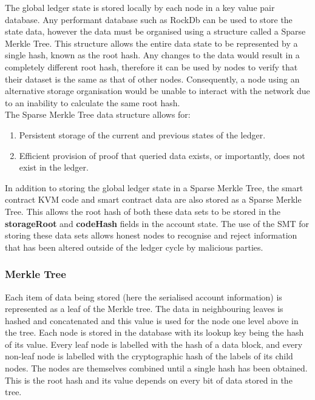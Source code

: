 
The global ledger state is stored locally by each node in a key value pair database. Any performant database such as RockDb can be used to store the state data, however the data must be organised using a structure called a Sparse Merkle Tree. This structure allows the entire data state to be represented by a single hash, known as the root hash. Any changes to the data would result in a completely different root hash, therefore it can be used by nodes to verify that their dataset is the same as that of other nodes. Consequently, a node using an alternative storage organisation would be unable to interact with the network due to an inability to calculate the same root hash.\\

The Sparse Merkle Tree data structure allows for:

\begin{enumerate}
\item Persistent storage of the current and previous states of the ledger.
\item Efficient provision of proof that queried data exists, or importantly, does not exist in the ledger.\end{enumerate}

In addition to storing the global ledger state in a Sparse Merkle Tree, the smart contract KVM code and smart contract data are also stored as a Sparse Merkle Tree. This allows the root hash of both these data sets to be stored in the \textbf{storageRoot} and \textbf{codeHash} fields in the account state.  The use of the SMT for storing these data sets allows honest nodes to recognise and reject information that has been altered outside of the ledger cycle by malicious parties. \\

\subsubsection{Merkle Tree}

Each item of data being stored (here the serialised account information) is represented as a leaf of the Merkle tree. The data in neighbouring leaves is hashed and concatenated and this value is used for the node one level above in the tree. Each node is stored in the database with its lookup key being the hash of its value. Every leaf node is labelled with the hash of a data block, and every non-leaf node is labelled with the cryptographic hash of the labels of its child nodes. The nodes are themselves combined until a single hash has been obtained. This is the root hash and its value depends on every bit of data stored in the tree.\\

